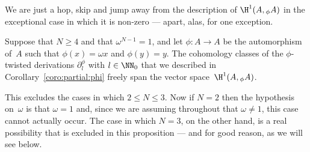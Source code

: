 We are just a hop, skip and jump away from the description of
$\H^1(A,{}_\phi A)$ in the exceptional case in which it is non-zero ---
apart, alas, for one exception.

\begin{Proposition}\label{prop:h1:phi:base}
Suppose that $N\geq4$ and that $\omega^{N-1}=1$, and let $\phi:A\to A$ be
the automorphism of~$A$ such that $\phi(x)=\omega x$ and $\phi(y)=y$. The
cohomology classes of the $\phi$-twisted derivations $\partial^\phi_l$ with
$l\in\NN_0$ that we described in Corollary~\ref{coro:partial:phi} freely
span the vector space~$\H^1(A,{}_\phi A)$.
\end{Proposition}

This excludes the cases in which $2\leq N\leq 3$. Now if $N=2$ then the
hypothesis on~$\omega$ is that $\omega=1$ and, since we are assuming
throughout that $\omega\neq1$, this case cannot actually occur. The case in
which $N=3$, on the other hand, is a real possibility that is excluded in
this proposition --- and for good reason, as we will see below.

